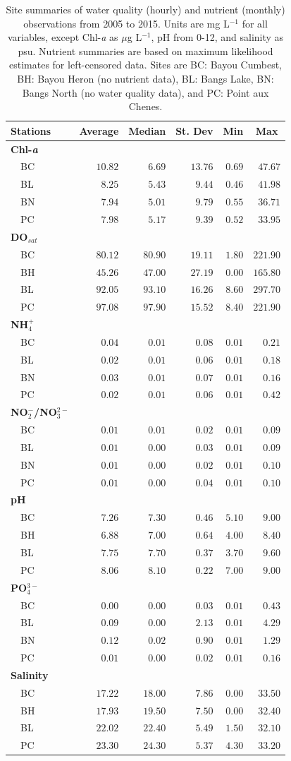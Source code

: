 \documentclass[letterpaper,12pt]{article}\usepackage[]{graphicx}\usepackage[]{color}
\begin{document}
\begin{table}[!tbp]
\caption{Site summaries of water quality (hourly) and nutrient (monthly) observations from 2005 to 2015.  Units are mg L$^{-1}$ for all variables, except Chl-\textit{a} as $\mu$g L$^{-1}$, pH from 0-12, and salinity as psu. Nutrient summaries are based on maximum likelihood estimates for left-censored data.  Sites are BC: Bayou Cumbest, BH: Bayou Heron (no nutrient data), BL: Bangs Lake, BN: Bangs North (no water quality data), and PC: Point aux Chenes.\label{tab:summtab}} 
\begin{center}
\begin{tabular}{lrrrrr}
\hline\hline
\multicolumn{1}{l}{Stations}&\multicolumn{1}{c}{Average}&\multicolumn{1}{c}{Median}&\multicolumn{1}{c}{St. Dev}&\multicolumn{1}{c}{Min}&\multicolumn{1}{c}{Max}\tabularnewline
\hline
{\bfseries Chl-\textit{a}}&&&&&\tabularnewline
~~BC&$10.82$&$ 6.69$&$13.76$&$0.69$&$ 47.67$\tabularnewline
~~BL&$ 8.25$&$ 5.43$&$ 9.44$&$0.46$&$ 41.98$\tabularnewline
~~BN&$ 7.94$&$ 5.01$&$ 9.79$&$0.55$&$ 36.71$\tabularnewline
~~PC&$ 7.98$&$ 5.17$&$ 9.39$&$0.52$&$ 33.95$\tabularnewline
\hline
{\bfseries DO$_{sat}$}&&&&&\tabularnewline
~~BC&$80.12$&$80.90$&$19.11$&$1.80$&$221.90$\tabularnewline
~~BH&$45.26$&$47.00$&$27.19$&$0.00$&$165.80$\tabularnewline
~~BL&$92.05$&$93.10$&$16.26$&$8.60$&$297.70$\tabularnewline
~~PC&$97.08$&$97.90$&$15.52$&$8.40$&$221.90$\tabularnewline
\hline
{\bfseries NH$_4^+$}&&&&&\tabularnewline
~~BC&$ 0.04$&$ 0.01$&$ 0.08$&$0.01$&$  0.21$\tabularnewline
~~BL&$ 0.02$&$ 0.01$&$ 0.06$&$0.01$&$  0.18$\tabularnewline
~~BN&$ 0.03$&$ 0.01$&$ 0.07$&$0.01$&$  0.16$\tabularnewline
~~PC&$ 0.02$&$ 0.01$&$ 0.06$&$0.01$&$  0.42$\tabularnewline
\hline
{\bfseries NO$_2^-$/NO$_3^{2-}$}&&&&&\tabularnewline
~~BC&$ 0.01$&$ 0.01$&$ 0.02$&$0.01$&$  0.09$\tabularnewline
~~BL&$ 0.01$&$ 0.00$&$ 0.03$&$0.01$&$  0.09$\tabularnewline
~~BN&$ 0.01$&$ 0.00$&$ 0.02$&$0.01$&$  0.10$\tabularnewline
~~PC&$ 0.01$&$ 0.00$&$ 0.04$&$0.01$&$  0.10$\tabularnewline
\hline
{\bfseries pH}&&&&&\tabularnewline
~~BC&$ 7.26$&$ 7.30$&$ 0.46$&$5.10$&$  9.00$\tabularnewline
~~BH&$ 6.88$&$ 7.00$&$ 0.64$&$4.00$&$  8.40$\tabularnewline
~~BL&$ 7.75$&$ 7.70$&$ 0.37$&$3.70$&$  9.60$\tabularnewline
~~PC&$ 8.06$&$ 8.10$&$ 0.22$&$7.00$&$  9.00$\tabularnewline
\hline
{\bfseries PO$_4^{3-}$}&&&&&\tabularnewline
~~BC&$ 0.00$&$ 0.00$&$ 0.03$&$0.01$&$  0.43$\tabularnewline
~~BL&$ 0.09$&$ 0.00$&$ 2.13$&$0.01$&$  4.29$\tabularnewline
~~BN&$ 0.12$&$ 0.02$&$ 0.90$&$0.01$&$  1.29$\tabularnewline
~~PC&$ 0.01$&$ 0.00$&$ 0.02$&$0.01$&$  0.16$\tabularnewline
\hline
{\bfseries Salinity}&&&&&\tabularnewline
~~BC&$17.22$&$18.00$&$ 7.86$&$0.00$&$ 33.50$\tabularnewline
~~BH&$17.93$&$19.50$&$ 7.50$&$0.00$&$ 32.40$\tabularnewline
~~BL&$22.02$&$22.40$&$ 5.49$&$1.50$&$ 32.10$\tabularnewline
~~PC&$23.30$&$24.30$&$ 5.37$&$4.30$&$ 33.20$\tabularnewline
\hline
\end{tabular}\end{center}
\end{table}
\end{document}
